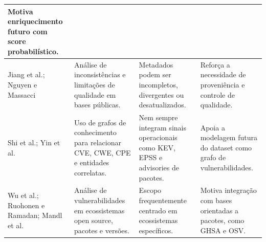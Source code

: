 \begin{table}[htbp]
{\begin{tabular}{|>{\RaggedRight\arraybackslash}p{3.6cm}|>{\RaggedRight\arraybackslash}p{4.6cm}|>{\RaggedRight\arraybackslash}p{4.8cm}|>{\RaggedRight\arraybackslash}p{4.0cm}|}
            Motiva enriquecimento futuro com score probabilístico.                                                                                                                          \\
            \hline
            Jiang et al.; Nguyen e Massacci                                                     &
            Análise de inconsistências e limitações de qualidade em bases públicas.             &
            Metadados podem ser incompletos, divergentes ou desatualizados.                     &
            Reforça a necessidade de proveniência e controle de qualidade.                                                                                                                  \\
            \hline
            Shi et al.; Yin et al.                                                              &
            Uso de grafos de conhecimento para relacionar CVE, CWE, CPE e entidades correlatas. &
            Nem sempre integram sinais operacionais como KEV, EPSS e advisories de pacotes.     &
            Apoia a modelagem futura do dataset como grafo de vulnerabilidades.                                                                                                             \\
            \hline
            Wu et al.; Ruohonen e Ramadan; Mandl et al.                                         &
            Análise de vulnerabilidades em ecossistemas open source, pacotes e versões.         &
            Escopo frequentemente centrado em ecossistemas específicos.                         &
            Motiva integração com bases orientadas a pacotes, como GHSA e OSV.                                                                                                              \\
            \hline
        \end{tabular}%
    }
\end{table}

